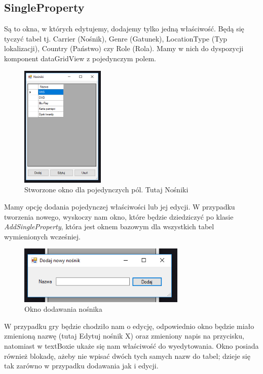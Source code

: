 \documentclass{article}
\begin{document}
\subsection{SingleProperty}
Są to okna, w których edytujemy, dodajemy tylko jedną właściwość. Będą się tyczyć tabel tj. Carrier (Nośnik), Genre (Gatunek), LocationType (Typ lokalizacji), Country (Państwo) czy Role (Rola). Mamy w nich do dyspozycji komponent dataGridView z pojedynczym polem. 
\begin{figure}[!ht]
\centering
\includegraphics[width=4cm]{carrier.PNG}
\caption{Stworzone okno dla pojedynczych pól. Tutaj Nośniki}
\end{figure}
Mamy opcję dodania pojedynczej właściwości lub jej edycji. W przypadku tworzenia nowego, wyskoczy nam okno, które będzie dziedziczyć po klasie \textit{AddSingleProperty}, która jest oknem bazowym dla wszystkich tabel wymienionych wcześniej. 
\begin{figure}[!ht]
\centering
\includegraphics[width=8cm]{addcarrier.PNG}
\caption{Okno dodawania nośnika}
\end{figure}

W przypadku gry będzie chodziło nam o edycję, odpowiednio okno będzie miało zmienioną nazwę (tutaj Edytuj nośnik X) oraz zmieniony napis na przycisku, natomiast w textBoxie ukaże się nam właściwość do wyedytowania. Okno posiada również blokadę, ażeby nie wpisać dwóch tych samych nazw do tabel; dzieje się tak zarówno w przypadku dodawania jak i edycji.
\end{document}
